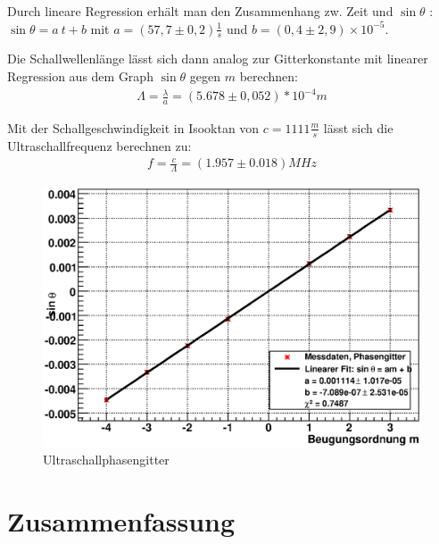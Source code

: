 \documentclass[12pt]{article}
\begin{document}
Durch lineare Regression erhält man den Zusammenhang zw. Zeit und $\sin\theta$ : $\sin\theta = a~t + b$ mit $a = (57,7 \pm 0,2) \frac{1}{s}$
und $b = (0,4 \pm 2,9)\times 10^{-5}$.

Die Schallwellenlänge lässt sich dann analog zur Gitterkonstante mit linearer Regression aus dem Graph $\sin\theta$ gegen $m$ berechnen:
\begin{align}
 \Lambda = \frac{\lambda}{a} = (5.678 \pm 0,052)*10^{-4} m
\end{align}

Mit der Schallgeschwindigkeit in Isooktan von $c = 1111 \frac{m}{s}$ lässt sich die Ultraschallfrequenz berechnen zu:
\begin{align}
 f = \frac{c}{\Lambda} = (1.957 \pm 0.018) MHz
\end{align}

\begin{figure}[H]  
\centering
\includegraphics[width=0.9\linewidth]{pictures/phasengitter.eps}
\caption{Ultraschallphasengitter}
\end{figure}

\newpage

\section{Zusammenfassung}
\end{document}
